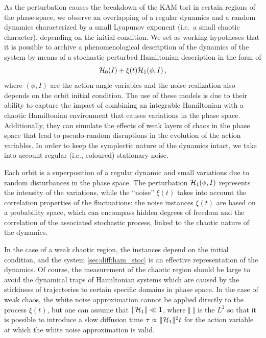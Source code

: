As the perturbation causes the breakdown of the KAM tori in certain regions of the phase-space, we observe an overlapping of a regular dynamics and a random dynamics characterized by a small Lyapunov exponent (i.e.\ a small chaotic character), depending on the initial condition. We set as working hypotheses that it is possible to archive a phenomenological description of the dynamics of the system by means of a stochastic perturbed Hamiltonian description in the form of
\begin{equation}
    \mathcal{H}_0(I)+\xi(t) \mathcal{H}_1(\phi,I) \,,
    \label{sec:diff:ham_stoc}
\end{equation}
where $(\phi,I)$ are the action-angle variables and the noise realization also depends on the orbit initial condition. The use of these models is due to their ability to capture the impact of combining an integrable Hamiltonian with a chaotic Hamiltonian environment that causes variations in the phase space. Additionally, they can simulate the effects of weak layers of chaos in the phase space that lead to pseudo-random disruptions in the evolution of the action variables. In order to keep the symplectic nature of the dynamics intact, we take into account regular (i.e., coloured) stationary noise.

Each orbit is a superposition of a regular dynamic and small variations due to random disturbances in the phase space. The perturbation $\mathcal{H}_1(\phi,I)$ represents the intensity of the variations, while the ``noise'' $\xi(t)$ takes into account the correlation properties of the fluctuations: the noise instances $\xi(t)$ are based on a probability space, which can encompass hidden degrees of freedom and the correlation of the associated stochastic process, linked to the chaotic nature of the dynamics.

In the case of a weak chaotic region, the instances depend on the initial condition, and the system \eqref{sec:diff:ham_stoc} is an effective representation of the dynamics. Of course, the measurement of the chaotic region should be large to avoid the dynamical traps of Hamiltonian systems which are caused by the stickiness of trajectories to certain specific domains in phase space. In the case of weak chaos, the white noise approximation cannot be applied directly to the process $\xi(t)$, but one can assume that $\Vert \mathcal{H}_1\Vert \ll 1$, where $\Vert\ \Vert$ is the $L^2$ so that it is possible to introduce a slow diffusion time $\tau \propto \Vert \mathcal{H}_1\Vert^2 t$ for the action variable at which the white noise approximation is valid.

